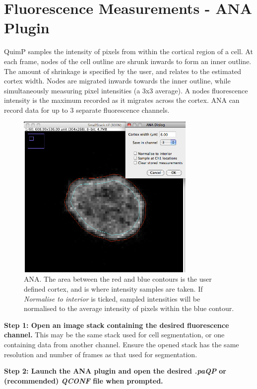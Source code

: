 \documentclass[a4paper,12pt]{article}
\begin{document}
\section{Fluorescence Measurements - ANA Plugin}
\label{ana}

QuimP samples the intensity of pixels from within the cortical region of a cell.  At each frame, nodes of the cell outline
are shrunk inwards to form an inner outline.  The amount of shrinkage is specified by the user, and relates to the
estimated cortex width.  Nodes are 
migrated inwards towards the inner outline, while simultaneously measuring pixel intensities  (a 3x3 average).  
A nodes fluorescence intensity is the maximum recorded as it migrates across the cortex.  ANA can record data for up to 3 separate 
fluorescence channels.

\begin{figure}[ht]
   \centering
   \includegraphics[height=8cm]{ana.png} %
   \caption{ANA.  The area between the red and blue contours is the user defined cortex, and is where
   intensity samples are taken. If \emph{Normalise to interior} is ticked, sampled intensities will be normalised
   to the average intensity of pixels within the blue contour.}
   \label{fig:ana}
\end{figure}

\textbf{Step 1: Open an image stack containing the desired fluorescence channel.}  This may be the same stack used 
for cell segmentation, or one containing data from another channel.  Ensure the opened stack has the 
same resolution and number of frames as that used for segmentation.

\textbf{Step 2: Launch the ANA plugin and open the desired \textit{.paQP} or (recommended) \textit{QCONF} file when prompted.}
\end{document}
